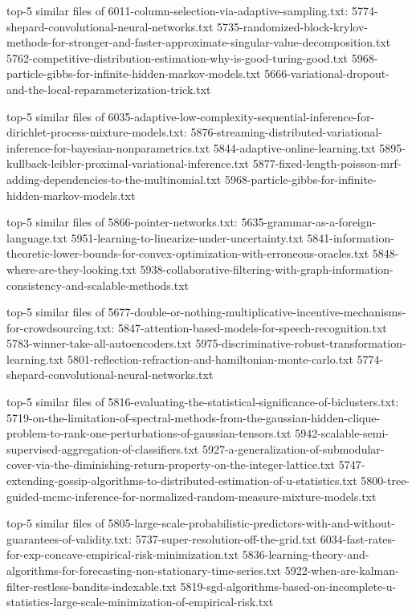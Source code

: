 \documentclass[11pt]{article}
\begin{document}
top-5 similar files of 6011-column-selection-via-adaptive-sampling.txt:
5774-shepard-convolutional-neural-networks.txt
5735-randomized-block-krylov-methods-for-stronger-and-faster-approximate-singular-value-decomposition.txt
5762-competitive-distribution-estimation-why-is-good-turing-good.txt
5968-particle-gibbs-for-infinite-hidden-markov-models.txt
5666-variational-dropout-and-the-local-reparameterization-trick.txt

top-5 similar files of
6035-adaptive-low-complexity-sequential-inference-for-dirichlet-process-mixture-models.txt:
5876-streaming-distributed-variational-inference-for-bayesian-nonparametrics.txt
5844-adaptive-online-learning.txt
5895-kullback-leibler-proximal-variational-inference.txt
5877-fixed-length-poisson-mrf-adding-dependencies-to-the-multinomial.txt
5968-particle-gibbs-for-infinite-hidden-markov-models.txt

top-5 similar files of 5866-pointer-networks.txt:
5635-grammar-as-a-foreign-language.txt
5951-learning-to-linearize-under-uncertainty.txt
5841-information-theoretic-lower-bounds-for-convex-optimization-with-erroneous-oracles.txt
5848-where-are-they-looking.txt
5938-collaborative-filtering-with-graph-information-consistency-and-scalable-methods.txt

top-5 similar files of
5677-double-or-nothing-multiplicative-incentive-mechanisms-for-crowdsourcing.txt:
5847-attention-based-models-for-speech-recognition.txt
5783-winner-take-all-autoencoders.txt
5975-discriminative-robust-transformation-learning.txt
5801-reflection-refraction-and-hamiltonian-monte-carlo.txt
5774-shepard-convolutional-neural-networks.txt

top-5 similar files of
5816-evaluating-the-statistical-significance-of-biclusters.txt:
5719-on-the-limitation-of-spectral-methods-from-the-gaussian-hidden-clique-problem-to-rank-one-perturbations-of-gaussian-tensors.txt
5942-scalable-semi-supervised-aggregation-of-classifiers.txt
5927-a-generalization-of-submodular-cover-via-the-diminishing-return-property-on-the-integer-lattice.txt
5747-extending-gossip-algorithms-to-distributed-estimation-of-u-statistics.txt
5800-tree-guided-mcmc-inference-for-normalized-random-measure-mixture-models.txt

top-5 similar files of
5805-large-scale-probabilistic-predictors-with-and-without-guarantees-of-validity.txt:
5737-super-resolution-off-the-grid.txt
6034-fast-rates-for-exp-concave-empirical-risk-minimization.txt
5836-learning-theory-and-algorithms-for-forecasting-non-stationary-time-series.txt
5922-when-are-kalman-filter-restless-bandits-indexable.txt
5819-sgd-algorithms-based-on-incomplete-u-statistics-large-scale-minimization-of-empirical-risk.txt
\end{document}
